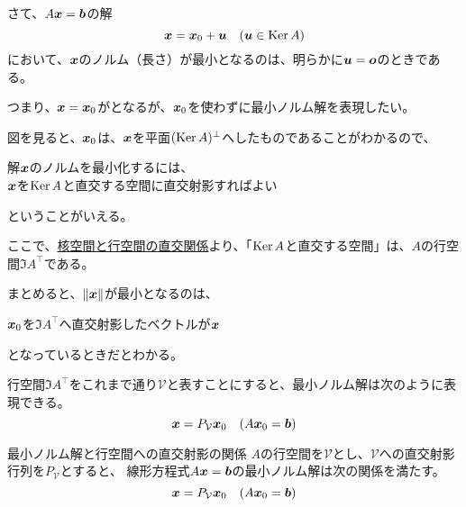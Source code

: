 \documentclass[../../../topic_linear-algebra]{subfiles}
\begin{document}
さて、$A\vb*{x} = \vb*{b}$の解
\begin{equation*}
  \vb*{x} = \vb*{x}_0 + \vb*{u} \quad (\vb*{u} \in \operatorname{Ker} A)
\end{equation*}
において、$\vb*{x}$のノルム（長さ）が最小となるのは、明らかに$\vb*{u} = \vb*{o}$のときである。

つまり、$\vb*{x} = \vb*{x}_0$がとなるが、$\vb*{x}_0$を使わずに最小ノルム解を表現したい。

\br

図を見ると、$\vb*{x}_0$は、$\vb*{x}$を平面$(\operatorname{Ker} A)^\perp$へしたものであることがわかるので、
\begin{emphabox}
  \begin{spacebox}
    \begin{center}
      解$\vb*{x}$のノルムを最小化するには、\\
      $\vb*{x}$を$\operatorname{Ker} A$と直交する空間に直交射影すればよい
    \end{center}
  \end{spacebox}
\end{emphabox}
ということがいえる。

\br

ここで、\hyperref[thm:kernel-row-orthogonality]{核空間と行空間の直交関係}より、「$\operatorname{Ker} A$と直交する空間」は、$A$の行空間$\Im A^\top$である。

\br

まとめると、$\| \vb*{x} \|$が最小となるのは、
\begin{spacebox}
  \begin{center}
    $\vb*{x}_0$を$\Im A^\top$へ直交射影したベクトルが$\vb*{x}$
  \end{center}
\end{spacebox}
となっているときだとわかる。

\br

行空間$\Im A^\top$をこれまで通り$\mathcal{V}$と表すことにすると、最小ノルム解は次のように表現できる。
\begin{equation*}
  \vb*{x} = P_{\mathcal{V}} \vb*{x}_0 \quad (A\vb*{x}_0 = \vb*{b})
\end{equation*}

\begin{theorem}{最小ノルム解と行空間への直交射影の関係}\label{thm:min-norm-solution-projection}
  $A$の行空間を$\mathcal{V}$とし、$\mathcal{V}$への直交射影行列を$P_{\mathcal{V}}$とすると、
  線形方程式$A\vb*{x} = \vb*{b}$の最小ノルム解は次の関係を満たす。
  \begin{equation*}
    \vb*{x} = P_{\mathcal{V}} \vb*{x}_0 \quad (A\vb*{x}_0 = \vb*{b})
  \end{equation*}
\end{theorem}
\end{document}
